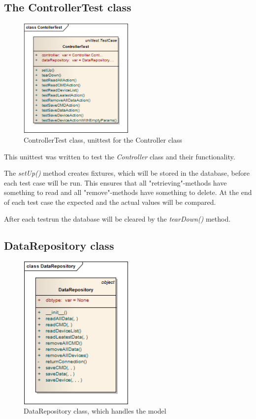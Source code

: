 \newpage
\subsection{The ControllerTest class}
\begin{figure}[H]
   \centering
   \includegraphics[width=0.5\textwidth]{pic/ControllerTest.png}%
   \caption{ControllerTest class, unittest for the Controller class}
   \label{ControllerTestpic}%
\end{figure}

This unittest was written to test the \textit{Controller} class and their functionality. 

The \textit{setUp()} method creates fixtures, which will be stored in the database, before each test case will be run. This ensures that all "retrieving"-methods have something to read and all "remove"-methods have something to delete. At the end of each test case the expected and the actual values will be compared. 

After each testrun the database will be cleared by the \textit{tearDown()} method. 

\newpage
\subsection{DataRepository class}
\begin{figure}[H]
   \centering
   \includegraphics[width=0.5\textwidth]{pic/DataRepository.png}%
   \caption{DataRepository class, which handles the model}
   \label{DataRepositorypic}%
\end{figure}

